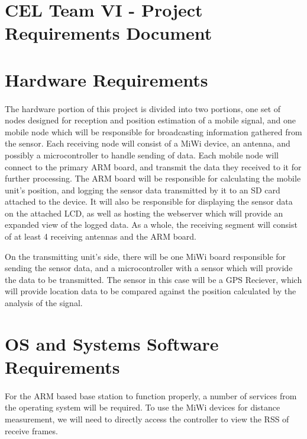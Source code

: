 \documentclass{article}
\begin{document}
\section*{CEL Team VI - Project Requirements Document}
\section*{Hardware Requirements}
\paragraph*{}
The hardware portion of this project is divided into two portions, one set of nodes designed for reception and position estimation of a mobile signal, and one mobile node which will be responsible for broadcasting information gathered from the sensor. Each receiving node will consist of a MiWi device, an antenna, and possibly a microcontroller to handle sending of data. Each mobile node will connect to the primary ARM board, and transmit the data they received to it for further processing. The ARM board will be responsible for calculating the mobile unit's position, and logging the sensor data transmitted by it to an SD card attached to the device. It will also be responsible for displaying the sensor data on the attached LCD, as well as hosting the webserver which will provide an expanded view of the logged data. As a whole, the receiving segment will consist of at least 4 receiving antennas and the ARM board.

On the transmitting unit's side, there will be one MiWi board responsible for sending the sensor data, and a microcontroller with a sensor which will provide the data to be transmitted. The sensor in this case will be a GPS Reciever, which will provide location data to be compared against the position calculated by the analysis of the signal.

\section*{OS and Systems Software Requirements}
\paragraph*{}
For the ARM based base station to function properly, a number of services from
the operating system will be required.  To use the MiWi devices for distance
measurement, we will need to directly access the controller to view the RSS of
receive frames.
\end{document}
